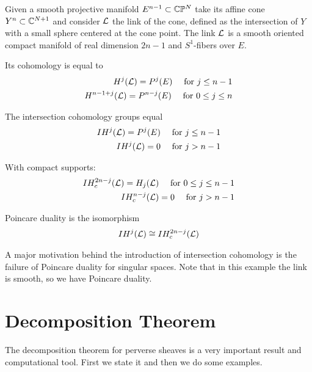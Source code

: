 \documentclass[12pt]{article}
\begin{document}
Given a smooth projective manifold $E^{n-1}\subset \mathbb{C}\mathbb{P}^{N}$ take its affine cone
$Y^n \subset \mathbb{C}^{N+1}$ and consider ${\mathcal{L}}$ the link of the cone, defined
as the intersection of $Y$ with a small sphere centered at the cone point.
The link ${\mathcal{L}}$ is a smooth oriented
compact manifold of real dimension $2n-1$ and $S^1$-fibers over $E$.

Its cohomology is equal to \begin{align*}
    H^j(\cL) = P^j(E) \texty{ for } j\leq n-1 \\
    H^{n-1+j}(\cL) = P^{n-j}(E) \texty{ for } 0\leq j\leq n
\end{align*}

The intersection cohomology groups equal \begin{align*}
    IH^j(\cL) = P^j(E) \texty{ for } j\leq n-1 \\
    IH^j(\cL) = 0 \texty{ for } j > n-1
\end{align*}

With compact supports:
\begin{align*}
    IH^{2n-j}_c(\cL) =H_j(\cL) \texty{ for } 0\leq j\leq n-1 \\
    IH^{n-j}_c(\cL) = 0 \texty{ for } j > n-1
\end{align*}

Poincare duality is the isomorphism \begin{align*}
    IH^j({\mathcal{L}}) \cong IH^{2n-j}_c({\mathcal{L}})
\end{align*}

\begin{remark}
    A major motivation behind the introduction of intersection
    cohomology is the failure of Poincare duality for singular spaces.
    Note that in this example the link is smooth, so we have Poincare duality.
\end{remark}

\section{Decomposition Theorem}
The decomposition theorem for perverse sheaves is a very
important result and computational tool. First we state it and then we do
some examples.
\end{document}
